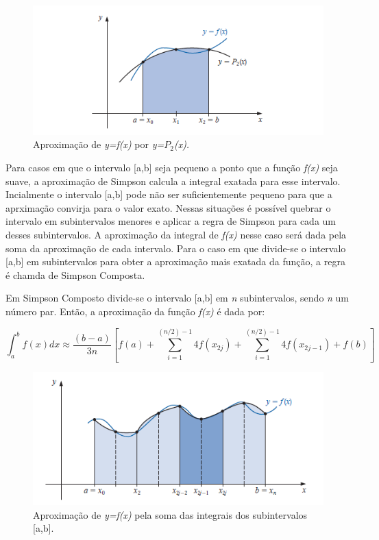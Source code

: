 \documentclass[12pt,a4paper]{article}
\begin{document}
\begin{figure}[h]
\includegraphics{simpsonapproximation}
\caption{Aproximação de \textit{y=f(x)} por \textit{y=$P_{2}$(x).}}
\end{figure}


\quad Para casos em que o intervalo [a,b] seja pequeno a ponto que a função \textit{f(x)} seja suave, a aproximação de Simpson calcula a integral exatada para esse intervalo. Incialmente o intervalo [a,b] pode não ser suficientemente pequeno para que a aprximação convirja para o valor exato. Nessas situações é possível quebrar o intervalo em subintervalos menores e aplicar a regra de Simpson para cada um desses subintervalos. A aproximação da integral de \textit{f(x)} nesse caso será dada pela soma da aproximação de cada intervalo. Para o caso em que divide-se o intervalo [a,b] em subintervalos para obter a aproximação mais exatada da função, a regra é chamda de Simpson Composta.\\

\newpage

\quad Em Simpson Composto divide-se o intervalo [a,b] em \textit{n} subintervalos, sendo \textit{n} um número par. Então, a aproximação da função \textit{f(x)} é dada por:

\begin{equation}
\int_{a}^{b} f(x)dx \approx \dfrac{(b-a)}{3n} [f(a) + \sum_{i=1}^{(n/2)-1}4f(x_{2j})+ \sum_{i=1}^{(n/2)-1}4f(x_{2j-1}) + f(b)] 
\end{equation}

\begin{figure}[h]
\includegraphics{simpsoncompositeapproximation}
\caption{Aproximação de \textit{y=f(x)} pela soma das integrais dos subintervalos [a,b].}
\end{figure}
\end{document}
